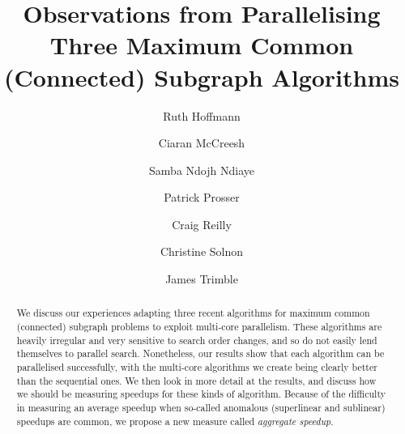 \documentclass[sigconf]{acmart}
\begin{document}
\title[Observations from Parallelising Three Subgraph Algorithms]{Observations from Parallelising Three Maximum Common (Connected) Subgraph Algorithms}

\author{Ruth Hoffmann}

\author{Ciaran McCreesh}

\author{Samba Ndojh Ndiaye}

\author{Patrick Prosser}

\author{Craig Reilly}

\author{Christine Solnon}

\author{James Trimble}

\renewcommand{\shortauthors}{R. Hoffmann, C. McCreesh et al.}

\begin{abstract}
    We discuss our experiences adapting three recent algorithms for maximum common (connected)
    subgraph problems to exploit multi-core parallelism. These algorithms are heavily irregular and
    very sensitive to search order changes, and so do not easily lend themselves to parallel search.
    Nonetheless, our results show that each algorithm can be parallelised successfully, with the
    multi-core algorithms we create being clearly better than the sequential ones. We then look in
    more detail at the results, and discuss how we should be
    measuring speedups for these kinds of algorithm. Because of the difficulty in measuring an
    average speedup when so-called anomalous (superlinear and sublinear) speedups are common, we
    propose a new measure called \emph{aggregate speedup}.
\end{abstract}
\end{document}

